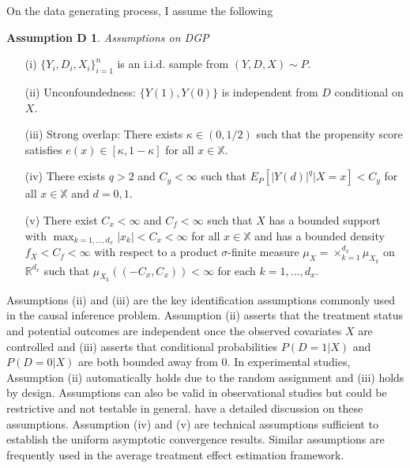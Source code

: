\documentclass[12pt,oneside,reqno,english]{amsart}
\theoremstyle{definition}
\newtheorem*{asmD}{Assumption D}
\begin{document}
On the data generating process, I assume the following 
\begin{asmD} \textit{Assumptions on DGP} 
\begin{itemize}
     \item[{(i)}] $\{Y_{i},D_{i},X_{i}\}_{i=1}^{n}$ is an i.i.d. sample from $(Y, D, X)\sim P$.
     \item[{(ii)}] Unconfoundedness: $\{Y(1),Y(0)\}$ is independent from $D$ conditional on $X$.   
     \item[{(iii)}] Strong overlap: There exists $\kappa\in (0,1/2)$ such that the propensity score satisfies $e(x)\in [\kappa,1-\kappa]$ for all $x\in \mathbb{X}$.
     \item[{(iv)}] There exists $q>2$ and $C_{y}<\infty$ such that $E_{P}[|Y(d)|^{q}|X=x]<C_{y}$ for all $x\in \mathbb{X}$ and $d = 0,1$.
     \item[{(v)}] There exist $C_{x}<\infty$ and $C_{f}<\infty$ such that $X$ has a bounded support with $\max_{k=1,\ldots,d_{x}} |x_{k}| < C_{x}<\infty$ for all $x\in \mathbb{X}$ and has a bounded density $f_{X}< C_{f}<\infty$ 
     with respect to a product $\sigma$-finite measure $\mu_{X}=\times_{k=1}^{d_{x}}\mu_{X_{k}}$ on $\mathbb{R}^{d_{x}}$
     such that $\mu_{X_{k}}\left(\left(-C_{x},C_{x}\right)\right)<\infty$ for each $k=1,\ldots,d_{x}$. 
\end{itemize}
\end{asmD}
Assumptions (ii) and (iii) are the key identification assumptions commonly used in the causal inference problem. 
Assumption (ii) asserts that the treatment status and potential outcomes are independent once the observed covariates $X$ are controlled and   
(iii) asserts that conditional probabilities $P(D=1|X)$ and $P(D=0|X)$ are both bounded away from $0$.
In experimental studies, Assumption (ii) automatically holds due to the random assignment 
and (iii) holds by design. Assumptions can also be valid in observational studies but could be restrictive and not testable in general.
 \cite{IR:15} have a detailed discussion on these assumptions. 
Assumption (iv) and (v) are technical assumptions sufficient to establish the uniform asymptotic convergence results. 
Similar assumptions are frequently used in the average treatment effect estimation framework. 
\end{document}
